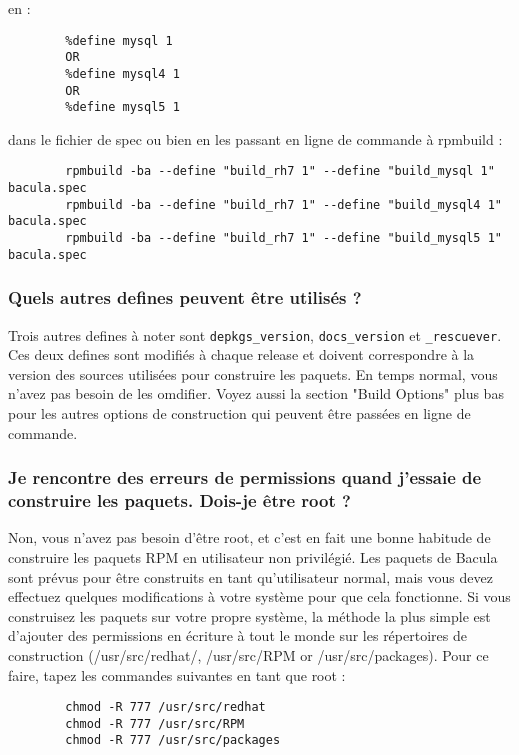 en :

\footnotesize
\begin{verbatim}
        %define mysql 1
        OR
        %define mysql4 1
        OR
        %define mysql5 1
\end{verbatim}
\normalsize

dans le fichier de spec ou bien en les passant en ligne de commande à rpmbuild :

\footnotesize
\begin{verbatim}
        rpmbuild -ba --define "build_rh7 1" --define "build_mysql 1" bacula.spec
        rpmbuild -ba --define "build_rh7 1" --define "build_mysql4 1" bacula.spec
        rpmbuild -ba --define "build_rh7 1" --define "build_mysql5 1" bacula.spec
\end{verbatim}
\normalsize

   
   \subsubsection{Quels autres defines peuvent être utilisés ?}
   Trois autres defines à noter sont \texttt{depkgs\_version}, 
   \texttt{docs\_version} et \texttt{\_rescuever}. Ces deux defines sont 
   modifiés à chaque release et doivent correspondre à la version des sources
   utilisées pour construire les paquets. En temps normal, vous n'avez pas 
   besoin de les omdifier. Voyez aussi la section "Build Options" plus bas pour
   les autres options de construction qui peuvent être passées en ligne de 
   commande.
  
   \subsubsection{Je rencontre des erreurs de permissions quand j'essaie de
   construire les paquets. Dois-je être root ?}
   Non, vous n'avez pas besoin d'être root, et c'est en fait une bonne habitude
   de construire les paquets RPM en utilisateur non privilégié. Les paquets de
   Bacula sont prévus pour être construits en tant qu'utilisateur normal, mais 
   vous devez effectuez quelques modifications à votre système pour que cela
   fonctionne. Si vous construisez les paquets sur votre propre système, la 
   méthode la plus simple est d'ajouter des permissions en écriture à tout le 
   monde sur les répertoires de construction (/usr/src/redhat/, /usr/src/RPM or
   /usr/src/packages).  
   Pour ce faire, tapez les commandes suivantes en tant que root :

\footnotesize
\begin{verbatim}
        chmod -R 777 /usr/src/redhat
        chmod -R 777 /usr/src/RPM
        chmod -R 777 /usr/src/packages
\end{verbatim}
\normalsize

